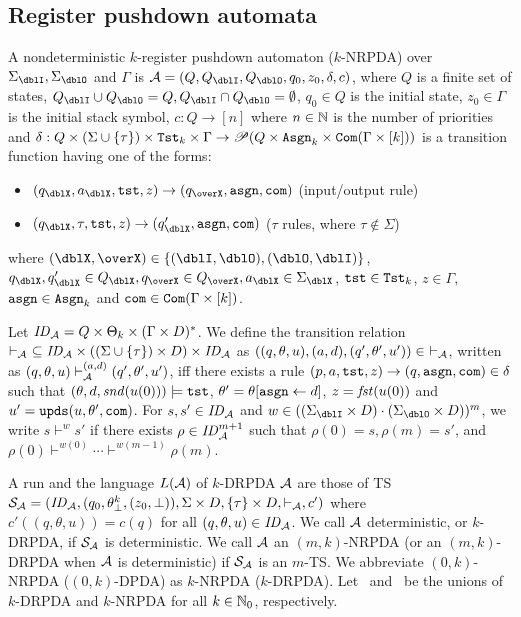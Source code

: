 \subsection{Register pushdown automata}\label{sec:RA}
\begin{definition}
A nondeterministic $k$-register pushdown automaton ($k$-NRPDA) over $\Sigma_\dblI,\Sigma_\dblO$ and $\Gamma$ is $\calA=(Q, Q_\dblI, Q_\dblO, q_0, z_0, \delta, c)$, where
$Q$ is a finite set of states,
$Q_\dblI\cup Q_\dblO = Q, Q_\dblI\cap Q_\dblO = \emptyset$,
$q_0\in Q$ is the initial state,
$z_0\in \Gamma$ is the initial stack symbol,
$c: Q \to [n]$ where $n\in \mathbb{N}$ is the number of priorities
and
$\delta: Q \times (\Sigma\cup\{\tau\})\times \mathtt{Tst}_k\times\Gamma \to \mathscr{P}(Q \times\mathtt{Asgn}_k\times \mathtt{Com}(\Gamma\times[k]))$ is a transition function having one of the forms:
\begin{itemize}
\item $(q_\dblX,a_\dblX,\tst,z)\to(q_\overX,\asgn,\com)$ (input/output rule)
\item $(q_\dblX,\tau,\tst,z)\to(q'_\dblX,\asgn,\com)$ ($\tau$ rules, where $\tau\notin\Sigma$)
\end{itemize}
where $(\dblX, \overX)\in\{(\dblI, \dblO), (\dblO,\dblI)\}$,
$q_\dblX, q'_\dblX\in Q_\dblX, q_\overX\in Q_\overX, a_\dblX\in \Sigma_\dblX$, $\mathtt{tst}\in\mathtt{Tst}_k$, $z\in\Gamma$, $\mathtt{asgn}\in\mathtt{Asgn}_k$ and $\mathtt{com}\in\mathtt{Com}(\Gamma\times[k])$.
\end{definition}
\noindent
Let $\mathit{ID}_{\cal A}= Q\times \Theta_k\times (\Gamma\times D)^*$.
We define the transition relation $\vdash_{\cal A}\ \subseteq\mathit{ID}_{\cal A}\times ((\Sigma\cup\{\tau\})\times D)\times \mathit{ID}_{\cal A}$ as
$((q,\theta,u), (a,d), (q',\theta',u'))\in\ \vdash_\calA$,
written as $(q,\theta,u)\vdash^{(a,d)}_{{\cal A}}(q',\theta',u')$, iff
there exists a rule $(p, a, \mathtt{tst}, z) \to (q, \mathtt{asgn}, \mathtt{com}) \in \delta$
such that
$(\theta, d, \mathit{snd}(u(0)))\models\mathtt{tst}$, $\theta' = \theta[\mathtt{asgn}\leftarrow d]$,
$z=\mathit{fst}(u(0))$ and
$u'= \mathtt{upds}(u,\theta',\mathtt{com})$.
For $s,s'\in\mathit{ID}_{\cal A}$ and
$w\in((\Sigma_\dblI\times D)\cdot (\Sigma_\dblO\times D))^{m}$,
we write $s\vdash^{w}s'$ if
there exists $\rho\in\mathit{ID}_{\cal A}^{m+1}$ such that
$\rho(0)=s, \rho(m)=s'$, and
$\rho(0)\vdash^{w(0)}\cdots\vdash^{w(m-1)}\rho(m)$.

A run and the language $L({\cal A})$ of $k$-DRPDA ${\cal A}$ are those of TS
${\cal S}_{\cal A}=(\mathit{ID}_{\cal A}, (q_0, \theta^k_\bot, (z_0,\bot)), \Sigma\times D, \{\tau\}\times D, \vdash_{\cal A}, c')$ where
$c'((q,\theta,u))=c(q)$ for all $(q,\theta,u)\in\mathit{ID}_{\cal A}$.
We call ${\cal A}$ deterministic, or $k$-DRPDA, if ${\cal S}_{\cal A}$ is deterministic.
We call ${\cal A}$ an $(m,k)$-NRPDA (or an $(m,k)$-DRPDA when ${\cal A}$ is deterministic)
if ${\cal S}_{\cal A}$ is an $m$-TS.
We abbreviate $(0,k)$-NRPDA ($(0,k)$-DPDA) as $k$-NRPDA ($k$-DRPDA).
Let \DRPDA\ and \NRPDA\ be the unions of $k$-DRPDA and $k$-NRPDA for all $k\in\mathbb{N}_0$, respectively.

